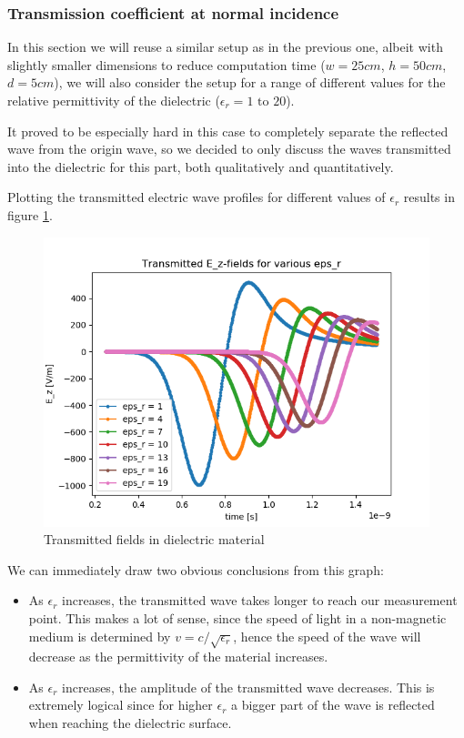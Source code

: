 \documentclass[11pt, a4paper]{article}
\begin{document}
\subsubsection{Transmission coefficient at normal incidence}
In this section we will reuse a similar setup as in the previous one, albeit with slightly smaller dimensions to reduce computation time ($w=25 cm$, $h=50 cm$, $d=5cm$), we will also consider the setup for a range of different values for the relative permittivity of the dielectric ($\epsilon_r = 1 \text{ to } 20$). 

It proved to be especially hard in this case to completely separate the reflected wave from the origin wave, so we decided to only discuss the waves transmitted into the dielectric for this part, both qualitatively and quantitatively.

Plotting the transmitted electric wave profiles for different values of $\epsilon_r$ results in figure \ref{T_fields}.

\begin{figure}[H]
    \centering
    \includegraphics[width=0.75\linewidth]{transmission/E_z_t_eps_r.png}
    \caption{Transmitted fields in dielectric material}
    \label{T_fields}
\end{figure}

We can immediately draw two obvious conclusions from this graph:
\begin{itemize}
    \item As $\epsilon_r$ increases, the transmitted wave takes longer to reach our measurement point. This makes a lot of sense, since the speed of light in a non-magnetic medium is determined by $v=c/\sqrt{\epsilon_r}$, hence the speed of the wave will decrease as the permittivity of the material increases. 
    \item As $\epsilon_r$ increases, the amplitude of the transmitted wave decreases. This is extremely logical since for higher $\epsilon_r$ a bigger part of the wave is reflected when reaching the dielectric surface.
\end{itemize}
\end{document}
